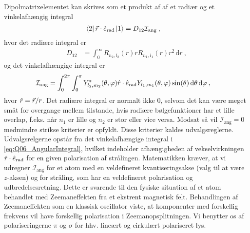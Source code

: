 Dipolmatrixelementet kan skrives som et produkt af af et radiær og et vinkelafhængig integral
\begin{align}
    \bra{2}\Vec{r}\cdot\Hat{e}_\text{rad}\ket{1} &= D_{12}\mathcal{I}_\text{ang} \: ,
\end{align}
hvor det radiære integral er
\begin{align}
    D_{12} &= \int_0^\infty R_{n_2,l_2}(r) r R_{n_1,l_1}(r) r^2 \, \text{d}r \: ,
\end{align}
og det vinkelafhængige integral er
\begin{align} \label{eq:Q06_AngularIntegral}
    \mathcal{I}_\text{ang} &= \int_0^{2\pi}\int_0^\pi Y_{l_2,m_2}^*(\theta,\phi) \Hat{r} \cdot \Hat{e}_\text{rad} Y_{l_1,m_1}(\theta,\phi) \sin(\theta) \, \text{d}\theta \, \text{d}\phi \: ,
\end{align}
hvor $\Hat{r} = \Vec{r}/r$.
Det radiære integral er normalt ikke 0, selvom det kan være meget småt for overgange mellem tilstande, hvis radiære bølgefunktioner har et lille overlap, f.eks. når $n_1$ er lille og $n_2$ er stor eller vice versa. Modsat så vil $\mathcal{I}_\text{ang} = 0$ medmindre strikse kriterier er opfyldt. Disse kriterier kaldes udvalgsreglerne.\\

Udvalgsrelgerne opstår fra det vinkelafhængige integral i \cref{eq:Q06_AngularIntegral}, hvilket indeholder afhængigheden af vekselvirkningen $\Hat{r}\cdot\Hat{e}_\text{rad}$ for en given polarisation af strålingen. Matematikken kræver, at vi udregner $\mathcal{I}_\text{ang}$ for et atom med en veldefineret kvantiseringsakse (valg til at være $z$-aksen) og for stråling, som har en veldefineret polarisation og udbredelsesretning. Dette er svarende til den fysiske situation af et atom behandlet med Zeemaneffekten fra et ekstrent magnetisk felt. Behandlingen af Zeemaneffekten som en klassisk oscillator viste, at komponenter med forskellig frekvens vil have forskellig polarisation i Zeemanopsplitningen. Vi benytter os af polariseringerne $\pi$ og $\sigma$ for hhv. lineært og cirkulært polariseret lys.

